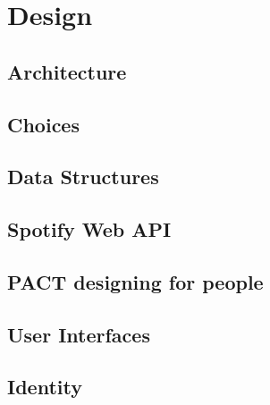 \chapter{Design}


\section{Architecture}


\section{Choices}




\section{Data Structures}




\section{Spotify Web API}


\section{PACT designing for people}


\section{User Interfaces}


\section{Identity}

